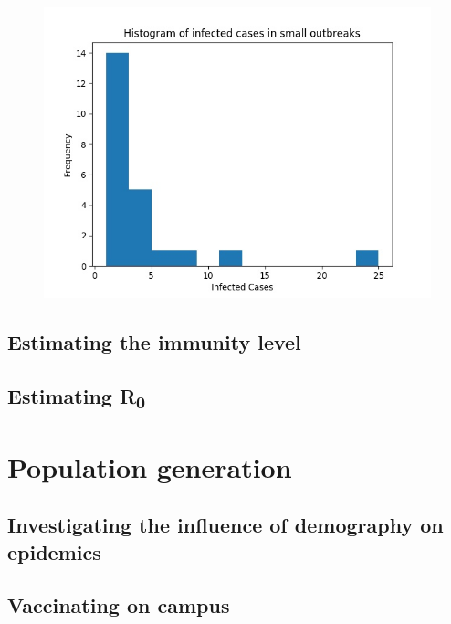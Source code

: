 \documentclass[runningheads]{llncs}
\begin{document}
\begin{figure}
	\includegraphics[width=\textwidth]{extinction_small.jpg}	
	\label{fig4}
\end{figure}


\subsection{Estimating the immunity level}
\subsection{Estimating R\textsubscript{0}}

\section{Population generation}
\subsection{Investigating the influence of demography on epidemics}
\subsection{Vaccinating on campus}
\newpage
\end{document}
